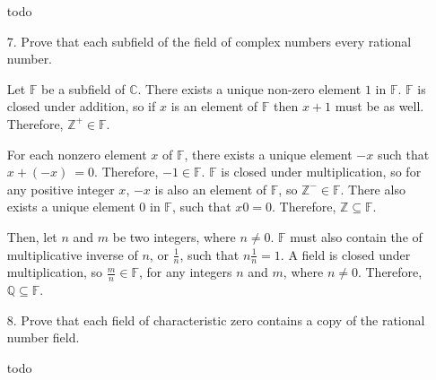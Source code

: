 \documentclass{article}
\begin{document}
\begin{enumerate}[listparindent=\parindent]
todo

\item[7.] Prove that each subfield of the field of complex numbers every rational number.

Let \(\mathbb F\) be a subfield of \(\mathbb C\).
There exists a unique non-zero element \(1\) in \(\mathbb F\).
\(\mathbb F\) is closed under addition, so if \(x\) is an element of \(\mathbb F\) then \(x + 1\) must be as well.
Therefore, \(\mathbb Z^+ \in \mathbb F\).

For each nonzero element \(x\) of \(\mathbb F\), there exists a unique element \(-x\) such that \(x + (-x)\ = 0\).
Therefore, \(-1 \in \mathbb F\).
\(\mathbb F\) is closed under multiplication, so for any positive integer \(x\), \(-x\) is also an element of \(\mathbb F\), 
so \(\mathbb Z^- \in \mathbb F\).
There also exists a unique element \(0\) in \(\mathbb F\), such that \(x0 = 0\).
Therefore, \(\mathbb Z \subseteq \mathbb F\).

Then, let \(n\) and \(m\) be two integers, where \(n \neq 0\).
\(\mathbb F\) must also contain the of multiplicative inverse of \(n\), or \(\frac{1}{n}\), such that \(n\frac{1}{n} = 1\).
A field is closed under multiplication, so \(\frac{m}{n} \in \mathbb F\),
for any integers \(n\) and \(m\), where \(n \neq 0\).
Therefore, \(\mathbb Q \subseteq \mathbb F\).

\item[8.]
    Prove that each field of characteristic zero contains a copy of the rational number field.

todo

\end{enumerate}
\end{document}
